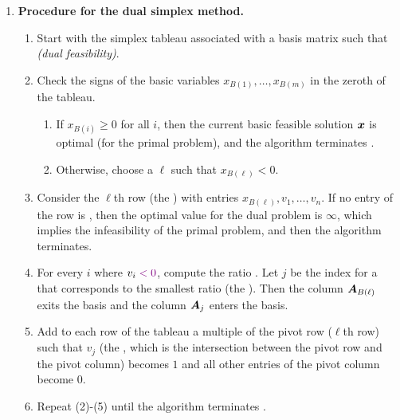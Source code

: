 \begin{enumerate}
\item \textbf{Procedure for the dual simplex method.}
\begin{enumerate}[label={(\arabic*)}]
\item Start with the simplex tableau associated with a basis matrix such that
 \emph{(dual feasibility)}.
\item Check the signs of the basic variables \(x_{B(1)},\dotsc,x_{B(m)}\) in
the zeroth  of the tableau.
\begin{enumerate}
\item If \(x_{B(i)}\ge 0\) for all \(i\), then the current basic feasible
solution \(\bm{x}\) is optimal (for the primal problem), and the algorithm
terminates .
\item Otherwise, choose a \(\ell\) such that \(x_{B(\ell)}<0\).
\end{enumerate}
\item Consider the \(\ell\)th row (the ) with entries
\(x_{B(\ell)},v_1,\dotsc,v_n\). If no entry of the row is , then
the optimal value for the dual problem is \(\infty\), which implies the
infeasibility of the primal problem, and then the algorithm terminates.
\item For every \(i\) where \(v_i\vc{<0}\), compute the ratio
. Let \(j\) be the index for a  that
corresponds to the smallest ratio (the ). Then the column
\(\bm{A}_{B(\ell)}\) exits the basis and the column \(\bm{A}_j\) enters the
basis.
\item Add to each row of the tableau a multiple of the pivot row (\(\ell\)th
row) such that \(v_j\) (the , which is the intersection
between the pivot row and the pivot column) becomes \(1\) and all other entries
of the pivot column become \(0\).
\item Repeat (2)-(5) until the algorithm terminates .
\end{enumerate}
\end{enumerate}

